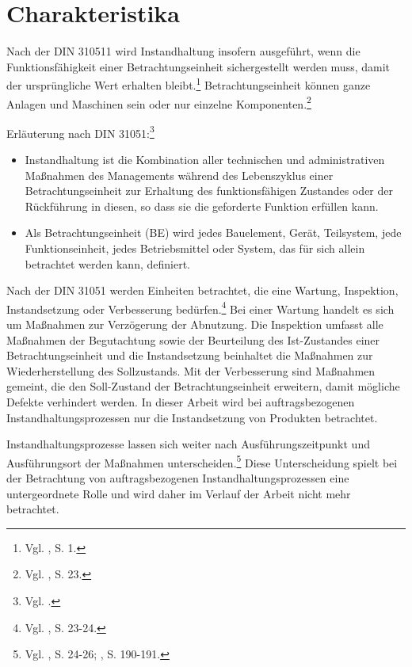 \section{Charakteristika}

Nach der DIN 310511 wird Instandhaltung insofern ausgeführt, wenn die Funktionsfähigkeit einer Betrachtungseinheit sichergestellt werden muss, damit der ursprüngliche Wert erhalten bleibt.\footnote{Vgl. \cite{Strunz:2012aa}, S. 1.} Betrachtungseinheit können ganze Anlagen und Maschinen sein oder nur einzelne Komponenten.\footnote{Vgl. \cite{schenk2010techSys}, S. 23.}

Erläuterung nach DIN 31051:\footnote{Vgl. \cite{DIN}.}
\begin{itemize}
\item Instandhaltung ist die Kombination aller technischen und administrativen Maßnahmen des Managements während des Lebenszyklus einer Betrachtungseinheit zur Erhaltung des funktionsfähigen Zustandes oder der Rückführung in diesen, so dass sie die geforderte Funktion erfüllen kann.
\item Als Betrachtungseinheit (BE) wird jedes Bauelement, Gerät, Teilsystem, jede Funktionseinheit, jedes Betriebsmittel oder System, das für sich allein betrachtet werden kann, definiert.
\end{itemize}

Nach der DIN 31051 werden Einheiten betrachtet, die eine Wartung, Inspektion, Instandsetzung oder Verbesserung bedürfen.\footnote{Vgl. \cite{schenk2010techSys}, S. 23-24.} Bei einer Wartung handelt es sich um Maßnahmen zur Verzögerung der Abnutzung. Die Inspektion umfasst alle Maßnahmen der Begutachtung sowie der Beurteilung des Ist-Zustandes einer Betrachtungseinheit und die Instandsetzung beinhaltet die Maßnahmen zur Wiederherstellung des Sollzustands. Mit der Verbesserung sind Maßnahmen gemeint, die den Soll-Zustand der Betrachtungseinheit erweitern, damit mögliche Defekte verhindert werden. In dieser Arbeit wird bei auftragsbezogenen Instandhaltungsprozessen nur die Instandsetzung von Produkten betrachtet.

Instandhaltungsprozesse lassen sich weiter nach Ausführungszeitpunkt und Ausführungsort der Maßnahmen unterscheiden.\footnote{Vgl. \cite{schenk2010techSys}, S. 24-26; \cite{hinsch2010instandhaltung}, S. 190-191.} Diese Unterscheidung spielt bei der Betrachtung von auftragsbezogenen Instandhaltungsprozessen eine untergeordnete Rolle und wird daher im Verlauf der Arbeit nicht mehr betrachtet.

